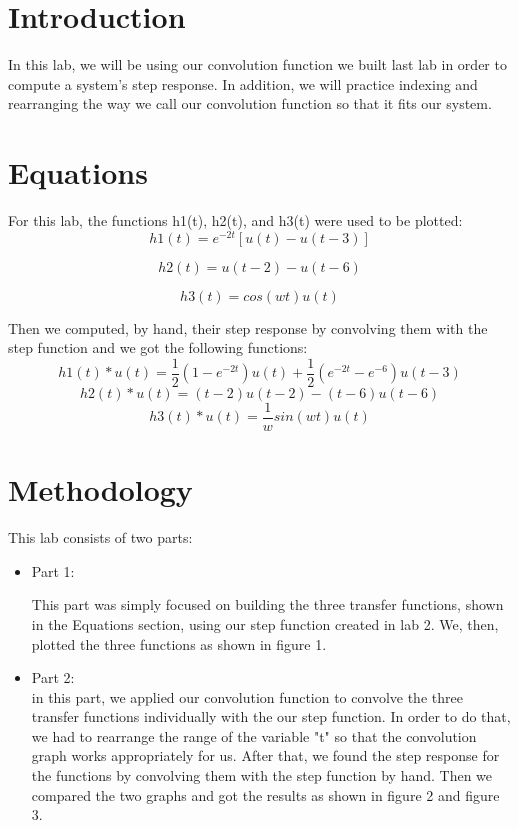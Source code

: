\documentclass[12pt]{report}
\begin{document}
\section{Introduction}
In this lab, we will be using our convolution function we built last lab in order to compute a system's step response. In addition, we will practice indexing and rearranging the way we call our convolution function so that it fits our system.

\section{Equations}

For this lab, the functions h1(t), h2(t), and h3(t) were used to be plotted:
\begin{equation}
    h1(t) =  e^{−2t}[u(t) − u(t − 3)]
\end{equation}

\begin{equation}
    h2(t) = u(t − 2) − u(t − 6)
\end{equation}

\begin{equation}
    h3(t) = cos(wt)u(t)
\end{equation}

Then we computed, by hand, their step response by convolving them with the step function and we got the following functions:
\begin{equation}
    h1(t)*u(t) = \frac{1}{2}(1 - e^{-2t})u(t) + \frac{1}{2}(e^{-2t} - e^{-6})u(t-3)
\end{equation}
\begin{equation}
    h2(t)*u(t) = (t-2)u(t-2) - (t-6)u(t-6)
\end{equation}
\begin{equation}
    h3(t)*u(t) = \frac{1}{w}sin(wt)u(t)
\end{equation}

\section{Methodology}

This lab consists of two parts:
\begin{itemize}
    \item
    Part 1:
    
    This part was simply focused on building the three transfer functions, shown in the Equations section, using our step function created in lab 2. We, then, plotted the three functions as shown in figure 1.

    \item
    Part 2:\\
    in this part, we applied our convolution function to convolve the three transfer functions individually with the our step function. In order to do that, we had to rearrange the range of the variable "t" so that the convolution graph works appropriately for us. After that, we found the step response for the functions by convolving them with the step function by hand. Then we compared the two graphs and got the results as shown in figure 2 and figure 3.
\end{itemize}
   
\end{document}

